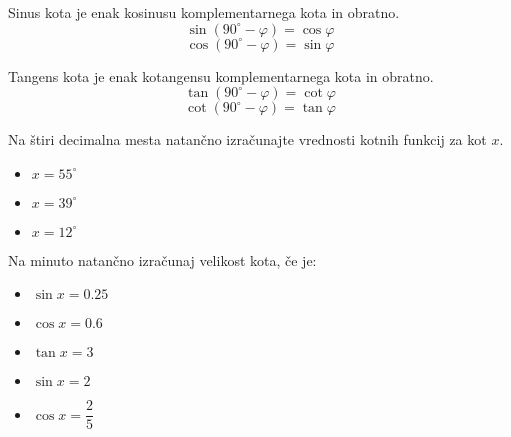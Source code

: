             
                Sinus kota je enak kosinusu komplementarnega kota in obratno.
                $$ \sin\left({90^\circ-\varphi}\right) = \cos\varphi $$
                $$ \cos\left({90^\circ-\varphi}\right) = \sin\varphi $$
            

            
                Tangens kota je enak kotangensu komplementarnega kota in obratno.
                $$ \tan\left({90^\circ-\varphi}\right) = \cot\varphi $$
                $$ \cot\left({90^\circ-\varphi}\right) = \tan\varphi $$
            
        







        
            \begin{naloga}
                Na štiri decimalna mesta natančno izračunajte vrednosti kotnih funkcij za kot $x$.
                \begin{itemize}
                    \item $x=55^\circ$
                    \item $x=39^\circ$
                    \item $x=12^\circ$
                \end{itemize}
            \end{naloga}


            \begin{naloga}
                Na minuto natančno izračunaj velikost kota, če je:
                \begin{itemize}
                    \item $\sin{x}=0.25$
                    \item $\cos{x}=0.6$
                    \item $\tan{x}=3$
                    \item $\sin{x}=2$
                    \item $\cos{x}=\dfrac{2}{5}$
                \end{itemize}
            \end{naloga}

